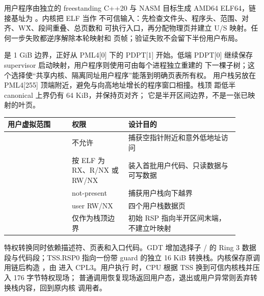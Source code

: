 用户程序由独立的 freestanding C++20 与 NASM 目标生成 AMD64
 ELF64，链接基址为 。内核把 ELF 当作
不可信输入：先检查文件头、程序头、范围、对齐、W\^X、段间重叠、总页数和
可执行入口，再分配物理页并建立 U/S 映射。任何一步失败都逆序解除本轮映射和
页帧；验证失败不会留下半份用户布局。

 是 1 GiB 边界，正好从 PML4[0] 下的 PDPT[1] 开始。低端
PDPT[0] 继续保存 supervisor 启动映射，用户程序则使用可由每个进程独立重建的
下一棵子树；这个选择使“共享内核、隔离同址用户程序”能落到明确页表所有权。
用户栈另放在 PML4[255] 顶端附近，避免与向高地址增长的程序窗口相撞。栈顶
 距低半 canonical 上界仍有 64 KiB，并保持页对齐；
它是半开区间边界，不是一张已映射的叶页。

\begin{longtable}{|L{0.25\linewidth}|L{0.22\linewidth}|L{0.43\linewidth}|}
\toprule
用户虚拟范围 & 权限 & 设计目的 \\
\midrule
{} & 不允许 & 捕获空指针附近和意外低地址访问 \\\tablerowrule
{} & 按 ELF 为 RX、R/NX 或 RW/NX & 装入首批用户代码、只读数据与可写数据 \\\tablerowrule
{} & not-present & 捕获用户栈向下越界 \\\tablerowrule
{} & user RW/NX & 四个用户栈数据页 \\\tablerowrule
{} & 仅作为栈顶边界 & 初始 RSP 指向半开区间末端，不建立叶映射 \\
\bottomrule
\end{longtable}

特权转换同时依赖描述符、页表和入口代码。GDT 增加选择子
/ 的 Ring 3 数据段与代码段；TSS.RSP0 指向一份带
guard 的独立 16 KiB 转换栈。内核保存原调用链后构造
，由  进入 CPL3。用户执行
 时，CPU 根据 TSS 换到可信内核栈并压入 176 字节特权现场；
普通调用恢复现场返回用户态，退出或用户异常则丢弃转换栈内容，回到原内核
调用者。

